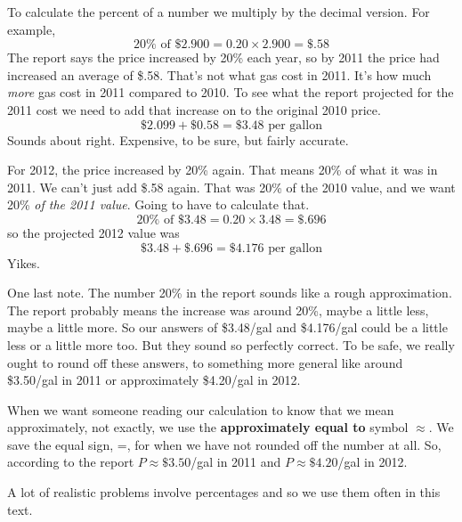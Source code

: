To calculate the percent of a number we multiply by the decimal version.  For example,
$$20\% \text{ of } \$2.900 = 0.20 \times 2.900 = \$.58$$
The report says the price increased by 20\% each year, so by 2011 the price had increased an average of \$.58.  That's not what gas cost in 2011.  It's how much \emph{more} gas cost in 2011 compared to 2010.  To see what the report projected for the 2011 cost we need to add that increase on to the original 2010 price.
$$\$2.099 + \$0.58= \$3.48\text{ per gallon}$$
Sounds about right.  Expensive, to be sure, but fairly accurate.

For 2012, the price increased by 20\% again.  That means 20\% of what it was in 2011.  We can't just add \$.58 again.  That was 20\% of the 2010 value, and we want 20\% \emph{of the 2011 value}.  Going to have to calculate that.
$$20\% \text{ of } \$3.48 = 0.20 \times 3.48 = \$.696$$
so the projected 2012 value was $$\$3.48 + \$.696= \$4.176\text{ per gallon}$$
Yikes.

One last note.  The number 20\% in the report sounds like a rough approximation.  The report probably means the increase was around 20\%, maybe a little less, maybe a little more.  So our answers of \$3.48/gal and \$4.176/gal could be a little less or a little more too.  But they sound so perfectly correct.  To be safe, we really ought to round off these answers, to something more general like around \$3.50/gal in 2011 or approximately \$4.20/gal in 2012.  %

When we want someone reading our calculation to know that we mean approximately, not exactly, we use the \textbf{approximately equal to} symbol $\approx$.  We save the equal sign, =, for when we have not rounded off the number at all.  So, according to the report $P \approx \$3.50$/gal in 2011 and $P \approx \$4.20$/gal in 2012.  

A lot of realistic problems involve percentages and so we use them often in this text.


